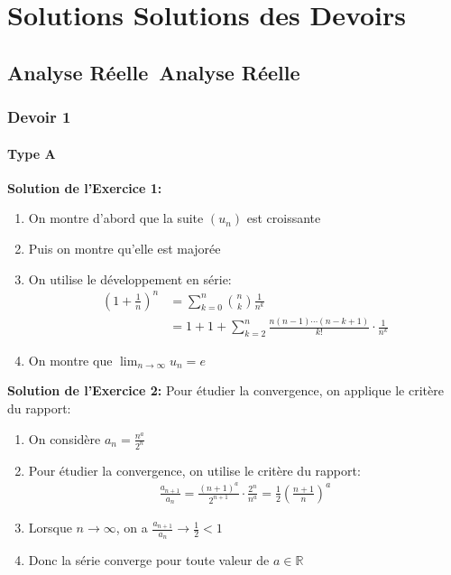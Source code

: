 \documentclass[11pt,%
	fleqn,%
	a4paper,%
	twoside%
]{backagBook}
\def\faCalculator{Analyse Réelle}%
\def\faLightbulb{Solutions}%
\begin{document}
\chapterspaceabove{6cm}
\chapter{{\faLightbulb} Solutions des Devoirs}

\section{\protect\faCalculator\ Analyse Réelle}

\subsection{Devoir 1}
\subsubsection{Type A}

\begin{solution}
\textbf{Solution de l'Exercice 1:}
\begin{enumerate}
    \item On montre d'abord que la suite $(u_n)$ est croissante
    \item Puis on montre qu'elle est majorée
    \item On utilise le développement en série:
          \begin{align*}
          \left(1 + \frac{1}{n}\right)^n &= \sum_{k=0}^{n} \binom{n}{k}\frac{1}{n^k} \\
          &= 1 + 1 + \sum_{k=2}^{n} \frac{n(n-1)\cdots(n-k+1)}{k!} \cdot \frac{1}{n^k}
          \end{align*}
    \item On montre que $\lim_{n\to\infty} u_n = e$
\end{enumerate}
\end{solution}

\begin{solution}
\textbf{Solution de l'Exercice 2:}
Pour étudier la convergence, on applique le critère du rapport:
\begin{enumerate}
    \item On considère $a_n = \frac{n^a}{2^n}$
    \item Pour étudier la convergence, on utilise le critère du rapport:
          \begin{align*}
          \frac{a_{n+1}}{a_n} = \frac{(n+1)^a}{2^{n+1}} \cdot \frac{2^n}{n^a} = \frac{1}{2}\left(\frac{n+1}{n}\right)^a
          \end{align*}
    \item Lorsque $n \to \infty$, on a $\frac{a_{n+1}}{a_n} \to \frac{1}{2} < 1$
    \item Donc la série converge pour toute valeur de $a \in \mathbb{R}$
\end{enumerate}
\end{solution}
\end{document}
